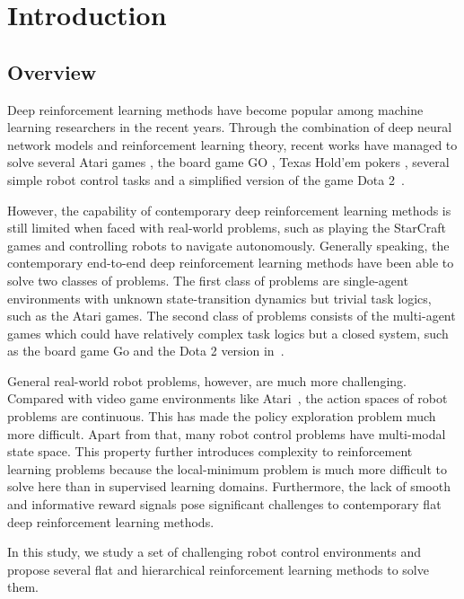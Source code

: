 
\chapter{Introduction}
\section{Overview}
Deep reinforcement learning methods have become popular among machine learning researchers in the recent years. Through the combination of deep neural network models and reinforcement learning theory, recent works have managed to solve several Atari games \cite{mnih2015human}, the board game GO \cite{silver2016mastering}, Texas Hold'em pokers \cite{heinrich2016deep}, several simple robot control tasks \cite{duan2016benchmarking} and a simplified version of the game Dota 2~\cite{openai_2018}.

However, the capability of contemporary deep reinforcement learning methods is still limited when faced with real-world problems, such as playing the StarCraft games and controlling robots to navigate autonomously. Generally speaking, the contemporary end-to-end deep reinforcement learning methods have been able to solve two classes of problems. The first class of problems are single-agent environments with unknown state-transition dynamics but trivial task logics, such as the Atari games. The second class of problems consists of the multi-agent games which could have relatively complex task logics but a closed system, such as the board game Go and the Dota 2 version in~\cite{openai_2018}. 

General real-world robot problems, however, are much more challenging. Compared with video game environments like Atari~\cite{mnih2015human}, the action spaces of robot problems are continuous. This has made the policy exploration problem much more difficult. Apart from that, many robot control problems have multi-modal state space. This property further introduces complexity to reinforcement learning problems because the local-minimum problem is much more difficult to solve here than in supervised learning domains. Furthermore, the lack of smooth and informative reward signals pose significant challenges to contemporary flat deep reinforcement learning methods.

In this study, we study a set of challenging robot control environments and propose several flat and hierarchical reinforcement learning methods to solve them.

